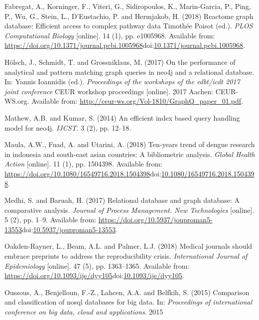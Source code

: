 \documentclass[]{article}
\begin{document}
\leavevmode\hypertarget{ref-Fabregat2018}{}%
Fabregat, A., Korninger, F., Viteri, G., Sidiropoulos, K., Marin-Garcia,
P., Ping, P., Wu, G., Stein, L., D'Eustachio, P. and Hermjakob, H.
(2018) Reactome graph database: Efficient access to complex pathway data
Timothée Poisot (ed.). \emph{PLOS Computational Biology} {[}online{]}.
14 (1), pp. e1005968. Available from:
\url{https://doi.org/10.1371/journal.pcbi.1005968}doi:\href{https://doi.org/10.1371/journal.pcbi.1005968}{10.1371/journal.pcbi.1005968}.

\leavevmode\hypertarget{ref-Holsch2017}{}%
Hölsch, J., Schmidt, T. and Grossniklaus, M. (2017) On the performance
of analytical and pattern matching graph queries in neo4j and a
relational database. In: Yannis Ioannidis (ed.). \emph{Proceedings of
the workshops of the edbt/icdt 2017 joint conference} CEUR workshop
proceedings {[}online{]}. 2017 Aachen: CEUR-WS.org. Available from:
\url{http://ceur-ws.org/Vol-1810/GraphQ_paper_01.pdf}.

\leavevmode\hypertarget{ref-Mathew2014}{}%
Mathew, A.B. and Kumar, S. (2014) An efficient index based query
handling model for neo4j. \emph{IJCST}. 3 (2), pp. 12--18.

\leavevmode\hypertarget{ref-Maula2018}{}%
Maula, A.W., Fuad, A. and Utarini, A. (2018) Ten-years trend of dengue
research in indonesia and south-east asian countries: A bibliometric
analysis. \emph{Global Health Action} {[}online{]}. 11 (1), pp. 1504398.
Available from:
\url{https://doi.org/10.1080/16549716.2018.1504398}doi:\href{https://doi.org/10.1080/16549716.2018.1504398}{10.1080/16549716.2018.1504398}.

\leavevmode\hypertarget{ref-Medhi2017}{}%
Medhi, S. and Baruah, H. (2017) Relational database and graph database:
A comparative analysis. \emph{Journal of Process Management. New
Technologies} {[}online{]}. 5 (2), pp. 1--9. Available from:
\url{https://doi.org/10.5937/jouproman5-13553}doi:\href{https://doi.org/10.5937/jouproman5-13553}{10.5937/jouproman5-13553}.

\leavevmode\hypertarget{ref-OakdenRayner2018}{}%
Oakden-Rayner, L., Beam, A.L. and Palmer, L.J. (2018) Medical journals
should embrace preprints to address the reproducibility crisis.
\emph{International Journal of Epidemiology} {[}online{]}. 47 (5), pp.
1363--1365. Available from:
\url{https://doi.org/10.1093/ije/dyy105}doi:\href{https://doi.org/10.1093/ije/dyy105}{10.1093/ije/dyy105}.

\leavevmode\hypertarget{ref-Oussous2015}{}%
Oussous, A., Benjelloun, F.-Z., Lahcen, A.A. and Belfkih, S. (2015)
Comparison and classification of nosql databases for big data. In:
\emph{Proceedings of international conference on big data, cloud and
applications}. 2015
\end{document}
